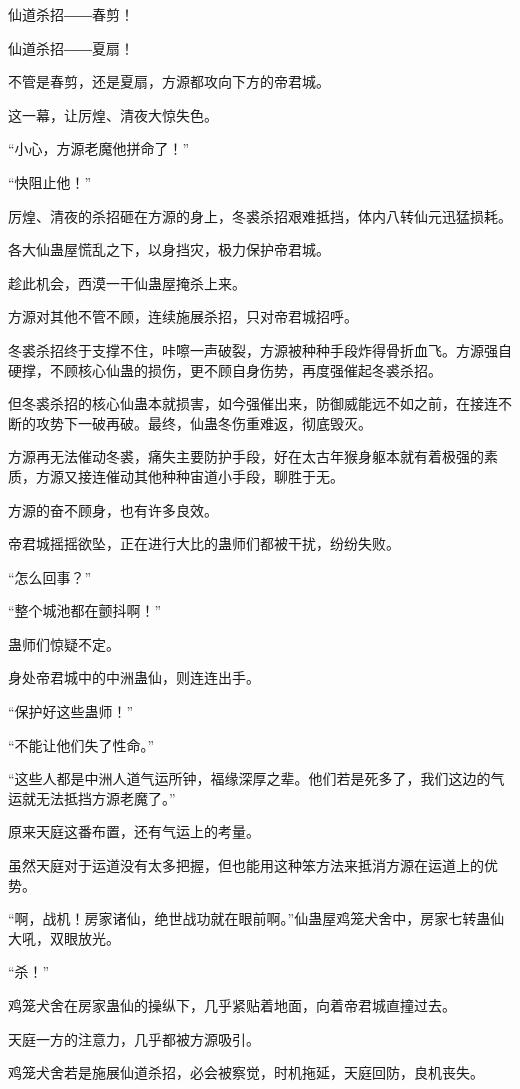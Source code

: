 \begin{this_body}
仙道杀招――春剪！

仙道杀招――夏扇！

不管是春剪，还是夏扇，方源都攻向下方的帝君城。

这一幕，让厉煌、清夜大惊失色。

“小心，方源老魔他拼命了！”

“快阻止他！”

厉煌、清夜的杀招砸在方源的身上，冬裘杀招艰难抵挡，体内八转仙元迅猛损耗。

各大仙蛊屋慌乱之下，以身挡灾，极力保护帝君城。

趁此机会，西漠一干仙蛊屋掩杀上来。

方源对其他不管不顾，连续施展杀招，只对帝君城招呼。

冬裘杀招终于支撑不住，咔嚓一声破裂，方源被种种手段炸得骨折血飞。方源强自硬撑，不顾核心仙蛊的损伤，更不顾自身伤势，再度强催起冬裘杀招。

但冬裘杀招的核心仙蛊本就损害，如今强催出来，防御威能远不如之前，在接连不断的攻势下一破再破。最终，仙蛊冬伤重难返，彻底毁灭。

方源再无法催动冬裘，痛失主要防护手段，好在太古年猴身躯本就有着极强的素质，方源又接连催动其他种种宙道小手段，聊胜于无。

方源的奋不顾身，也有许多良效。

帝君城摇摇欲坠，正在进行大比的蛊师们都被干扰，纷纷失败。

“怎么回事？”

“整个城池都在颤抖啊！”

蛊师们惊疑不定。

身处帝君城中的中洲蛊仙，则连连出手。

“保护好这些蛊师！”

“不能让他们失了性命。”

“这些人都是中洲人道气运所钟，福缘深厚之辈。他们若是死多了，我们这边的气运就无法抵挡方源老魔了。”

原来天庭这番布置，还有气运上的考量。

虽然天庭对于运道没有太多把握，但也能用这种笨方法来抵消方源在运道上的优势。

“啊，战机！房家诸仙，绝世战功就在眼前啊。”仙蛊屋鸡笼犬舍中，房家七转蛊仙大吼，双眼放光。

“杀！”

鸡笼犬舍在房家蛊仙的操纵下，几乎紧贴着地面，向着帝君城直撞过去。

天庭一方的注意力，几乎都被方源吸引。

鸡笼犬舍若是施展仙道杀招，必会被察觉，时机拖延，天庭回防，良机丧失。


\end{this_body}
